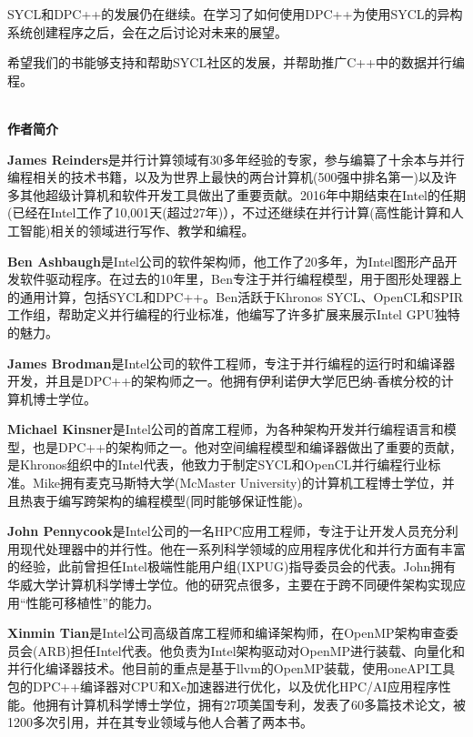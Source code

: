 \documentclass[11pt,a4paper,UTF8]{ctexart}
\begin{document}
	SYCL和DPC++的发展仍在继续。在学习了如何使用DPC++为使用SYCL的异构系统创建程序之后，会在之后讨论对未来的展望。\par
	
	希望我们的书能够支持和帮助SYCL社区的发展，并帮助推广C++中的数据并行编程。\par
	
	
	\hspace*{\fill} \\ %
	\noindent\textbf{作者简介}\ \par
	\textbf{James Reinders}是并行计算领域有30多年经验的专家，参与编纂了十余本与并行编程相关的技术书籍，以及为世界上最快的两台计算机(500强中排名第一)以及许多其他超级计算机和软件开发工具做出了重要贡献。2016年中期结束在Intel的任期(已经在Intel工作了10,001天(超过27年)），不过还继续在并行计算(高性能计算和人工智能)相关的领域进行写作、教学和编程。\par
	
	\textbf{Ben Ashbaugh}是Intel公司的软件架构师，他工作了20多年，为Intel图形产品开发软件驱动程序。在过去的10年里，Ben专注于并行编程模型，用于图形处理器上的通用计算，包括SYCL和DPC++。Ben活跃于Khronos SYCL、OpenCL和SPIR工作组，帮助定义并行编程的行业标准，他编写了许多扩展来展示Intel GPU独特的魅力。\par
	
	\textbf{James Brodman}是Intel公司的软件工程师，专注于并行编程的运行时和编译器开发，并且是DPC++的架构师之一。他拥有伊利诺伊大学厄巴纳-香槟分校的计算机博士学位。\par
	
	\textbf{Michael Kinsner}是Intel公司的首席工程师，为各种架构开发并行编程语言和模型，也是DPC++的架构师之一。他对空间编程模型和编译器做出了重要的贡献，是Khronos组织中的Intel代表，他致力于制定SYCL和OpenCL并行编程行业标准。Mike拥有麦克马斯特大学(McMaster University)的计算机工程博士学位，并且热衷于编写跨架构的编程模型(同时能够保证性能)。\par
	
	\textbf{John Pennycook}是Intel公司的一名HPC应用工程师，专注于让开发人员充分利用现代处理器中的并行性。他在一系列科学领域的应用程序优化和并行方面有丰富的经验，此前曾担任Intel极端性能用户组(IXPUG)指导委员会的代表。John拥有华威大学计算机科学博士学位。他的研究点很多，主要在于跨不同硬件架构实现应用“性能可移植性”的能力。\par
	
	\textbf{Xinmin Tian}是Intel公司高级首席工程师和编译架构师，在OpenMP架构审查委员会(ARB)担任Intel代表。他负责为Intel架构驱动对OpenMP进行装载、向量化和并行化编译器技术。他目前的重点是基于llvm的OpenMP装载，使用oneAPI工具包的DPC++编译器对CPU和Xe加速器进行优化，以及优化HPC/AI应用程序性能。他拥有计算机科学博士学位，拥有27项美国专利，发表了60多篇技术论文，被1200多次引用，并在其专业领域与他人合著了两本书。\par
	
\end{document}
